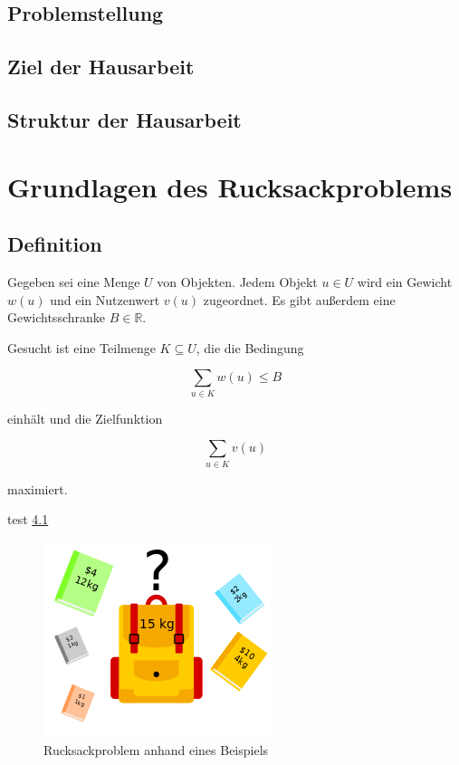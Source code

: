 \documentclass[12pt]{report}
\begin{document}
\section{Problemstellung}


\pagebreak
\section{Ziel der Hausarbeit}

\pagebreak
\section{Struktur der Hausarbeit}


\newpage
\chapter{Grundlagen des Rucksackproblems}


\section{Definition}
Gegeben sei eine Menge $U$ von Objekten. Jedem Objekt $u \in U$ wird ein Gewicht $w(u)$ und ein Nutzenwert $v(u)$ zugeordnet. Es gibt außerdem eine Gewichtsschranke $B \in \mathbb{R}$.

Gesucht ist eine Teilmenge $K \subseteq U$, die die Bedingung

$$\sum_{u \in K} w(u) \leq B$$

einhält und die Zielfunktion

$$\sum_{u \in K} v(u)$$

maximiert. \cite{kellerer2004knapsack}

test \ref{fig:rucksackproblem}

\begin{figure}[h]
	\centering
	\includegraphics[width=0.5 \linewidth]{Knapsack_Problem_Illustration}
	\caption{Rucksackproblem anhand eines Beispiels}
	\label{fig:rucksackproblem}
\end{figure}
\end{document}
